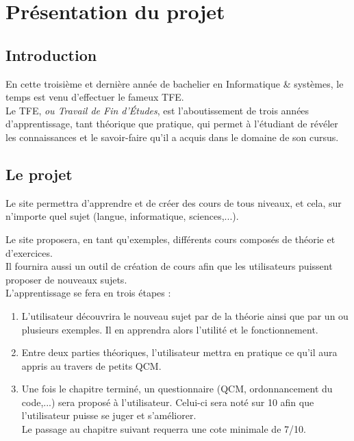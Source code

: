 \section{Présentation du projet}
\label{sec:presentation}


\subsection{Introduction}
\label{subsec:intro}
En cette troisième et dernière année de bachelier en Informatique \& systèmes, le temps est venu d'effectuer le fameux TFE.\\
Le TFE, \textit{ou Travail de Fin d'Études}, est l'aboutissement de  trois années d'apprentissage, tant théorique que pratique, qui permet à l'étudiant de révéler les connaissances et le savoir-faire qu'il a acquis dans le domaine de son cursus.


\subsection{Le projet}
\label{subsec:projet}
Le site permettra d'apprendre et de créer des cours de tous niveaux, et cela, sur n'importe quel sujet (langue, informatique, sciences,...).

Le site proposera, en tant qu'exemples, différents cours composés de théorie et d'exercices. \\
Il fournira aussi un outil de création de cours afin que les utilisateurs puissent proposer de nouveaux sujets. \\

L'apprentissage se fera en trois étapes :
\begin{enumerate}

    \item L'utilisateur découvrira le nouveau sujet par de la théorie ainsi que par un ou plusieurs exemples. Il en apprendra alors l'utilité et le fonctionnement.
    
    \item Entre deux parties théoriques, l'utilisateur mettra en pratique ce qu'il aura appris au travers de petits QCM.
    
    \item Une fois le chapitre terminé, un questionnaire (QCM, ordonnancement du code,...) sera proposé à l'utilisateur. Celui-ci sera noté sur 10 afin que l'utilisateur puisse se juger et s'améliorer. \\
    Le passage au chapitre suivant requerra une cote minimale de 7/10. \\
    
\end{enumerate}


